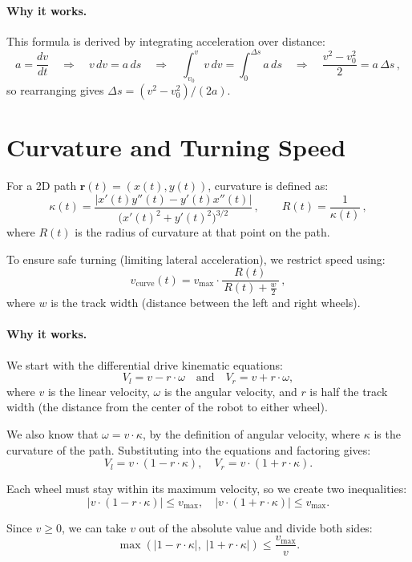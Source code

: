 \documentclass[11pt]{article}
\begin{document}
\paragraph{Why it works.} This formula is derived by integrating acceleration over distance:
\[
a = \frac{dv}{dt}
\quad\Rightarrow\quad
v\,dv = a\,ds
\quad\Rightarrow\quad
\int_{v_0}^{v} v\,dv = \int_{0}^{\Delta s} a\,ds
\quad\Rightarrow\quad
\frac{v^2 - v_0^2}{2} = a\,\Delta s\,,
\] 
so rearranging gives $\Delta s = (v^2 - v_0^2)/(2a)$.

\section{Curvature and Turning Speed}

For a 2D path \(\mathbf{r}(t) = (x(t), y(t))\), curvature is defined as:
\[
\kappa(t)
= \frac{|x'(t)y''(t) - y'(t)x''(t)|}
       {\big(x'(t)^2 + y'(t)^2\big)^{3/2}}\,,
\qquad
R(t) = \frac{1}{\kappa(t)}\,,
\] 
where \(R(t)\) is the radius of curvature at that point on the path.

To ensure safe turning (limiting lateral acceleration), we restrict speed using:
\[
v_{\text{curve}}(t)
= v_{\max} \cdot \frac{R(t)}{\,R(t) + \tfrac{w}{2}\,}\,,
\] 
where \(w\) is the track width (distance between the left and right wheels). 

\paragraph{Why it works.}
We start with the differential drive kinematic equations:
\[
V_l = v - r \cdot \omega \quad \text{and} \quad V_r = v + r \cdot \omega,
\]
where \(v\) is the linear velocity, \(\omega\) is the angular velocity, and \(r\) is half the track width (the distance from the center of the robot to either wheel).

We also know that \(\omega = v \cdot \kappa\), by the definition of angular velocity, where \(\kappa\) is the curvature of the path. Substituting into the equations and factoring gives:
\[
V_l = v \cdot (1 - r \cdot \kappa), \quad V_r = v \cdot (1 + r \cdot \kappa).
\]

Each wheel must stay within its maximum velocity, so we create two inequalities:
\[
|v \cdot (1 - r \cdot \kappa)| \le v_{\max}, \quad |v \cdot (1 + r \cdot \kappa)| \le v_{\max}.
\]

Since \(v \ge 0\), we can take \(v\) out of the absolute value and divide both sides:
\[
\max\left(|1 - r \cdot \kappa|,\; |1 + r \cdot \kappa|\right) \le \frac{v_{\max}}{v}.
\]
\end{document}
